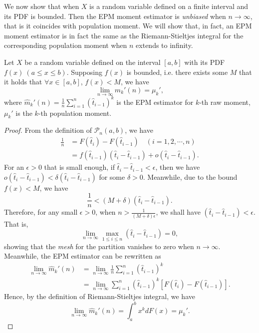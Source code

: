 We now show that when $ X $ is a random variable defined on a finite interval and its PDF is bounded. Then the EPM moment estimator is \textit{unbiased} when $ n \rightarrow \infty $, that is it coincides with population moment. We will show that, in fact, an EPM moment estimator is in fact the same as the Riemann-Stieltjes integral for the corresponding population moment when $ n $ extends to infinity.

\begin{thm}
Let $ X $ be a random variable defined on the interval $ [a, b] $ with its PDF $ f(x) \  (a \leq x \leq b) $. Supposing $ f(x) $ is bounded, i.e. there exists some $ M $ that it holds that $\forall x \in [a, b]$, $f(x) < M$, we have 
\begin{equation}
\lim_{n \rightarrow \infty} \hat{m}_{k}'(n) = \mu_k',
\end{equation}
where $ \hat{m}_{k}'(n) = \frac{1}{n} \sum_{i=1}^n (\hat{t}_{i-1})^k $ is the EPM estimator for $ k $-th raw moment, $ \mu_k' $ is the $ k $-th population moment. \label{thm:epm_consistent}
\end{thm} 

\begin{proof}
From the definition of $ \mathcal{P}_n(a,b) $, we have
\begin{align*}
\frac{1}{n} &= F(\hat{t}_i) - F(\hat{t}_{i-1}) \quad (i=1,2,\cdots,n) \\
&= f(\hat{t}_{i-1})(\hat{t}_i - \hat{t}_{i-1}) + o(\hat{t}_{i}-\hat{t}_{i-1}).
\end{align*}
For an $ \epsilon>0 $ that is small enough, if $ \hat{t}_i - \hat{t}_{i-1} < \epsilon $, then we have $ o(\hat{t}_{i}-\hat{t}_{i-1}) < \delta (\hat{t}_i - \hat{t}_{i-1}) $ for some $ \delta>0 $. Meanwhile, due to the bound $ f(x)<M $, we have
\[ \frac{1}{n} < (M+\delta)(\hat{t}_{i}-\hat{t}_{i-1}). \]
Therefore, for any small $ \epsilon>0 $, when $ n > \frac{1}{(M+\delta)\epsilon} $, we shall have $ (\hat{t}_i - \hat{t}_{i-1})<\epsilon $. That is, 
\[ \lim_{n \rightarrow \infty} \max_{1 \leq i \leq n} (\hat{t}_i - \hat{t}_{i-1}) = 0, \]
showing that the \textit{mesh} for the partition vanishes to zero when $ n \rightarrow \infty $.  
Meanwhile, the EPM estimator can be rewritten as
\begin{align*}
\lim_{n \rightarrow \infty} \hat{m}_k'(n) &= \lim_{n \rightarrow \infty} \frac{1}{n} \sum_{i=1}^n (\hat{t}_{i-1})^k \\
&= \lim_{n \rightarrow \infty} \sum_{i=1}^n (\hat{t}_{i-1})^k [F(\hat{t}_i) - F(\hat{t}_{i-1})].
\end{align*}
Hence, by the definition of Riemann-Stieltjes integral, we have 
\[ \lim_{n \rightarrow \infty} \hat{m}_{k}'(n) = \int_{a}^b x^k dF(x) = \mu_k'. \]
\end{proof}

